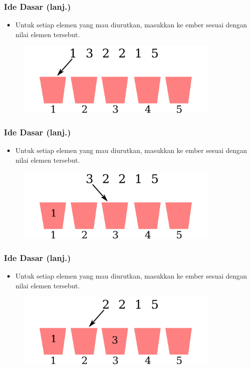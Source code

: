 \begin{frame}
\frametitle{Ide Dasar (lanj.)}
  \begin{itemize}
    \item Untuk setiap elemen yang mau diurutkan, masukkan ke ember
    sesuai dengan nilai elemen tersebut.
  \end{itemize}
  \begin{figure}
    \includegraphics[width=10cm]{asset/counting-sort-2.pdf}
  \end{figure}
\end{frame}

\begin{frame}
\frametitle{Ide Dasar (lanj.)}
  \begin{itemize}
    \item Untuk setiap elemen yang mau diurutkan, masukkan ke ember
    sesuai dengan nilai elemen tersebut.
  \end{itemize}
  \begin{figure}
    \includegraphics[width=10cm]{asset/counting-sort-3.pdf}
  \end{figure}
\end{frame}

\begin{frame}
\frametitle{Ide Dasar (lanj.)}
  \begin{itemize}
    \item Untuk setiap elemen yang mau diurutkan, masukkan ke ember
    sesuai dengan nilai elemen tersebut.
  \end{itemize}
  \begin{figure}
    \includegraphics[width=10cm]{asset/counting-sort-4.pdf}
  \end{figure}
\end{frame}

